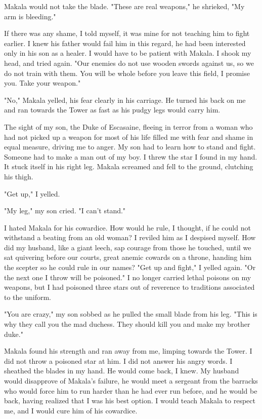 \documentclass{article}
\begin{document}
Makala would not take the blade. "These are real weapons," he shrieked, "My arm is bleeding."

If there was any shame, I told myself, it was mine for not teaching him to fight earlier. I knew his father would fail him in this regard, he had been interested only in his son as a healer. I would have to be patient with Makala. I shook my head, and tried again. "Our enemies do not use wooden swords against us, so we do not train with them. You will be whole before you leave this field, I promise you. Take your weapon."

"No," Makala yelled, his fear clearly in his carriage. He turned his back on me and ran towards the Tower as fast as his pudgy legs would carry him. 

The sight of my son, the Duke of Escasaine, fleeing in terror from a woman who had not picked up a weapon for most of his life filled me with fear and shame in equal measure, driving me to anger. My son had to learn how to stand and fight. Someone had to make a man out of my boy. I threw the star I found in my hand. It stuck itself in his right leg.  Makala screamed and fell to the ground, clutching his thigh.

"Get up," I yelled.

"My leg," my son cried. "I can't stand."

I hated Makala for his cowardice. How would he rule, I thought, if he could not withstand a beating from an old woman? I reviled him as I despised myself. How did my husband, like a giant leech, sap courage from those he touched, until we sat quivering before our courts, great anemic cowards on a throne,  handing him the scepter so he could rule in our names? "Get up and fight," I yelled again. "Or the next one I throw will be poisoned." I no longer carried lethal poisons on my weapons, but I had poisoned three stars out of reverence to traditions associated to the uniform. 

"You are crazy," my son sobbed as he pulled the small blade from his leg. "This is why they call you the mad duchess. They should kill you and make my brother duke."

Makala found his strength and ran away from me, limping towards the Tower. I did not throw a poisoned star at him. I did not answer his angry words. I sheathed the blades in my hand. He would come back, I knew. My husband would disapprove of Makala's failure, he would meet a sergeant from the barracks who would force him to run harder than he had ever run before, and he would be back, having realized that I was his best option. I would teach Makala to respect me, and I would cure him of his cowardice. 
\end{document}
